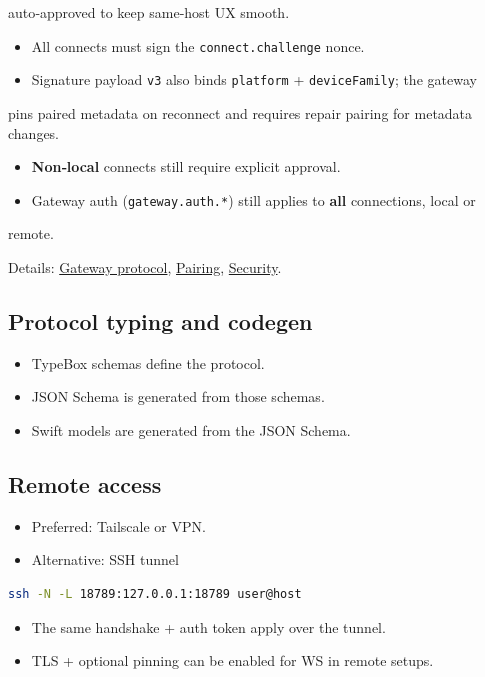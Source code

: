 auto‑approved to keep same‑host UX smooth.
\begin{itemize}
  \item All connects must sign the \texttt{connect.challenge} nonce.
  \item Signature payload \texttt{v3} also binds \texttt{platform} + \texttt{deviceFamily}; the gateway
\end{itemize}

pins paired metadata on reconnect and requires repair pairing for metadata
changes.
\begin{itemize}
  \item \textbf{Non‑local} connects still require explicit approval.
  \item Gateway auth (\texttt{gateway.auth.*}) still applies to \textbf{all} connections, local or
\end{itemize}

remote.

Details: \href{/gateway/protocol}{Gateway protocol}, \href{/channels/pairing}{Pairing},
\href{/gateway/security}{Security}.

\subsection{Protocol typing and codegen}


\begin{itemize}
  \item TypeBox schemas define the protocol.
  \item JSON Schema is generated from those schemas.
  \item Swift models are generated from the JSON Schema.
\end{itemize}


\subsection{Remote access}


\begin{itemize}
  \item Preferred: Tailscale or VPN.
  \item Alternative: SSH tunnel
\end{itemize}


\begin{lstlisting}[language=bash]
  ssh -N -L 18789:127.0.0.1:18789 user@host
\end{lstlisting}


\begin{itemize}
  \item The same handshake + auth token apply over the tunnel.
  \item TLS + optional pinning can be enabled for WS in remote setups.
\end{itemize}


